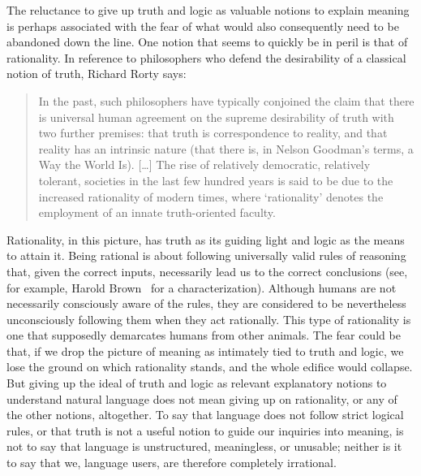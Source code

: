 \documentclass[a4paper]{article}
\begin{document}
The reluctance to give up truth and logic as valuable notions to explain meaning is perhaps associated with the fear of what would also consequently need to be abandoned down the line.
One notion that seems to quickly be in peril is that of rationality.
In reference to philosophers who defend the desirability of a classical notion of truth, Richard Rorty says:
\begin{quote}
In the past, such philosophers have typically conjoined the claim that there is universal human agreement on the supreme desirability of truth with two further premises: that truth is correspondence to reality, and that reality has an intrinsic nature (that there is, in Nelson Goodman's terms, a Way the World Is).
[\ldots]
The rise of relatively democratic, relatively tolerant, societies in the last few hundred years is said to be due to the increased rationality of modern times, where `rationality' denotes the employment of an innate truth-oriented faculty.%
~\parencite*[1]{rorty_response_2000-1}
\end{quote}
Rationality, in this picture, has truth as its guiding light and logic as the means to attain it.
Being rational is about following universally valid rules of reasoning that, given the correct inputs, necessarily lead us to the correct conclusions (see, for example, Harold Brown~\parencite*[19]{brown_rationality_1990} for a characterization).
Although humans are not necessarily consciously aware of the rules, they are considered to be nevertheless unconsciously following them when they act rationally.
This type of rationality is one that supposedly demarcates humans from other animals.
The fear could be that, if we drop the picture of meaning as intimately tied to truth and logic, we lose the ground on which rationality stands, and the whole edifice would collapse.
But giving up the ideal of truth and logic as relevant explanatory notions to understand natural language does not mean giving up on rationality, or any of the other notions, altogether.
To say that language does not follow strict logical rules, or that truth is not a useful notion to guide our inquiries into meaning, is not to say that language is unstructured, meaningless, or unusable; neither is it to say that we, language users, are therefore completely irrational.
\end{document}
